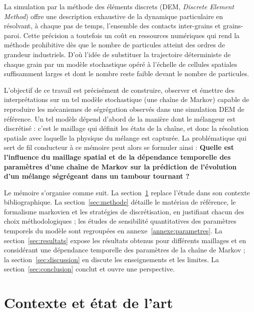 \documentclass[french]{MemoireMaster}
\begin{document}
La simulation par la méthode des éléments discrets (DEM, \textit{Discrete Element Method}) offre une description exhaustive de la dynamique particulaire en résolvant, à chaque pas de temps, l'ensemble des contacts inter-grains et grains-paroi. 
Cette précision a toutefois un coût en ressources numériques qui rend la méthode prohibitive dès que le nombre de particules atteint des ordres de grandeur industriels. 
D'où l'idée de substituer la trajectoire déterministe de chaque grain par un modèle stochastique opéré à l'échelle de cellules spatiales suffisamment larges et dont le nombre reste faible devant le nombre de particules.

L'objectif de ce travail est précisément de construire, observer et émettre des interprétations sur un tel modèle stochastique (une chaîne de Markov) capable de reproduire les mécanismes de ségrégation observés dans une simulation DEM de référence. 
Un tel modèle dépend d'abord de la manière dont le mélangeur est discrétisé : c'est le maillage qui définit les états de la chaîne, et donc la résolution spatiale avec laquelle la physique du mélange est capturée. 
La problématique qui sert de fil conducteur à ce mémoire peut alors se formuler ainsi : \textbf{Quelle est l'influence du maillage spatial et de la dépendance temporelle des paramètres d'une chaîne de Markov sur la prédiction de l'évolution d'un mélange ségrégeant dans un tambour tournant ? }

Le mémoire s'organise comme suit. La section~\ref{sec:contexte} replace l'étude dans son contexte bibliographique. 
La section~\ref{sec:methode} détaille le matériau de référence, le formalisme markovien et les stratégies de discrétisation, en justifiant chacun des choix méthodologiques ; les études de sensibilité quantitatives des paramètres temporels du modèle sont regroupées en annexe~\ref{annexe:parametres}.
La section~\ref{sec:resultats} expose les résultats obtenus pour différents maillages et en considérant une dépendance temporelle des paramètres de la chaîne de Markov ; la section~\ref{sec:discussion} en discute les enseignements et les limites. La section~\ref{sec:conclusion} conclut et ouvre une perspective.

\section{Contexte et état de l'art}
\label{sec:contexte}
\end{document}
